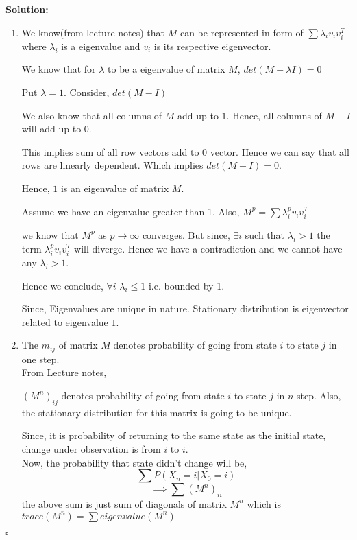 \documentclass[10pt]{article}
\newenvironment{solution}{\textbf{Solution:}}{\hfill$\square$}
\begin{document}
\begin{enumerate}
\begin{solution}
\begin{enumerate}
\item We know(from lecture notes) that $M$ can be represented in form of $\sum \lambda_{i} v_{i}v_{i}^T$ where $\lambda_{i}$ is a eigenvalue and $v_{i}$ is its respective eigenvector. \\
\par We know that for $\lambda$ to be a eigenvalue of matrix $M$, $det(M-\lambda I) =0$
\par Put $\lambda =1$. Consider, $det(M-I)$
\par We also know that all columns of $M$ add up to $1$. Hence, all columns of $M-I$ will add up to $0$.
\par This implies sum of all row vectors add to $0$ vector. Hence we can say that all rows are linearly dependent. Which implies $det(M-I) = 0$.
\par Hence, $1$ is an eigenvalue of matrix $M$. \\
\par Assume we have an eigenvalue greater than 1. Also, $M^p = \sum \lambda_{i}^p v_{i}v_{i}^T$
\par we know that $M^p$ as $p \rightarrow \infty$ converges. But since, $\exists i$ such that $\lambda_{i} > 1$ the term $\lambda_{i}^p v_{i}v_{i}^T$ will diverge. Hence we have a contradiction and we cannot have any $\lambda_{i} > 1$. \\
\par Hence we conclude, $\forall i$ $\lambda_{i} \leq 1$ i.e. bounded by 1. \\
\par Since, Eigenvalues are unique in nature. Stationary distribution is eigenvector related to eigenvalue $1$.
\item The $m_{ij}$ of matrix $M$ denotes probability of going from state $i$ to state $j$ in one step.
\\ From Lecture notes,
\par $(M^n)_{ij}$ denotes probability of going from state $i$ to state $j$ in $n$ step. Also, the stationary distribution for this matrix is going to be unique.
\par Since, it is probability of returning to the same state as the initial state,  change under observation is from $i$ to $i$.
\\ Now, the probability that state didn't change will be,
$$\sum P(X_{n} = i | X_{0} = i)$$
$$\implies \sum (M^n)_{ii}$$
the above sum is just sum of diagonals of matrix $M^n$ which is $trace(M^n) = \sum eigenvalue(M^n)$ \\

\end{enumerate}
\end{solution}
\end{enumerate}
\end{document}
